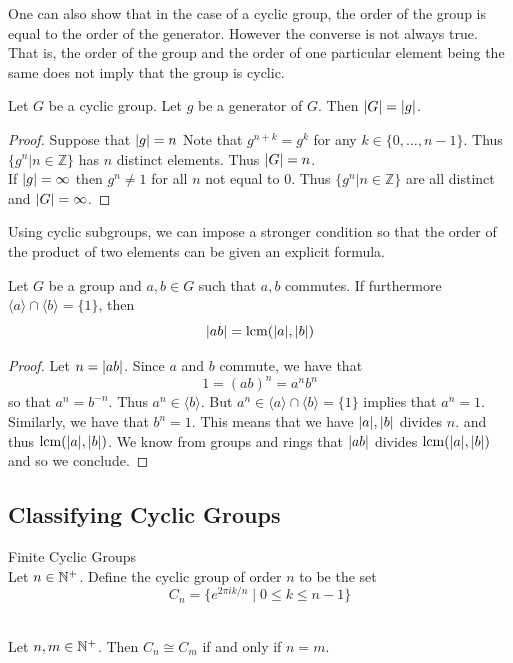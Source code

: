 \documentclass[a4paper]{article}
\begin{document}
One can also show that in the case of a cyclic group, the order of the group is equal to the order of the generator. However the converse is not always true. That is, the order of the group and the order of one particular element being the same does not imply that the group is cyclic. 

\begin{prp}{}{} Let $G$ be a cyclic group. Let $g$ be a generator of $G$. Then $\abs{G}=\abs{g}$. 
\begin{proof} Suppose that $\abs{g}=n$ Note that $g^{n+k}=g^k$ for any $k\in\{0,\dots,n-1\}$. Thus $\{g^n|n\in\mathbb{Z}\}$ has $n$ distinct elements. Thus $\abs{G}=n$. \\
If $\abs{g}=\infty$ then $g^n\neq 1$ for all $n$ not equal to $0$. Thus $\{g^n|n\in\mathbb{Z}\}$ are all distinct and $\abs{G}=\infty$.
\end{proof}
\end{prp}

Using cyclic subgroups, we can impose a stronger condition so that the order of the product of two elements can be given an explicit formula. 

\begin{prp}{}{} Let $G$ be a group and $a,b\in G$ such that $a,b$ commutes. If furthermore $\langle a\rangle\cap\langle b\rangle=\{1\}$, then $$\abs{ab}=\operatorname{lcm}(\abs{a},\abs{b})$$ 
\begin{proof}
Let $n=\abs{ab}$. Since $a$ and $b$ commute, we have that $$1=(ab)^n=a^nb^n$$ so that $a^n=b^{-n}$. Thus $a^n\in\langle b\rangle$. But $a^n\in\langle a\rangle\cap\langle b\rangle=\{1\}$ implies that $a^n=1$. Similarly, we have that $b^n=1$. This means that we have $\abs{a},\abs{b}$ divides $n$. and thus $\operatorname{lcm}(\abs{a},\abs{b})$. We know from groups and rings that $\abs{ab}$ divides $\operatorname{lcm}(\abs{a},\abs{b})$ and so we conclude. 
\end{proof}
\end{prp}

\subsection{Classifying Cyclic Groups}
\begin{defn}{Finite Cyclic Groups}{}\\
Let $n\in\mathbb{N}^+$. Define the cyclic group of order $n$ to be the set $$C_n=\{e^{2\pi i k/n}\;|\;0\leq k\leq n-1\}$$
\end{defn}

\begin{prp}{}{}\\
Let $n,m\in\mathbb{N}^+$. Then $C_n\cong C_m$ if and only if $n=m$. 
\end{prp}
\end{document}

